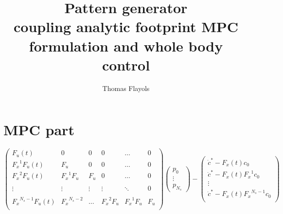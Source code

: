 \documentclass[10pt,a4paper]{article}
\begin{document}
\title{Pattern generator \\coupling analytic footprint MPC formulation and whole body control}
\author{Thomas Flayols}
\maketitle
\section*{MPC part}


\begin{equation}\label{min_velocity}
    \begin{pmatrix} 
         F_u(t)        		& 0 	 		& 0 &0& \hdots & 0 \\
         {F_x}^1 F_u(t) 		& F_u 	 		& 0 &0& \hdots & 0 \\
         {F_x}^2 F_u(t) 		& {F_x}^1 F_u 	& F_u &0& \hdots & 0 \\ \\
         \vdots	 			&\vdots 	& \vdots & \vdots &  \ddots & 0 \\ \\
         {F_x}^{N_s-1} F_u(t) 	&  {F_x}^{N_s-2}	& \hdots& {F_x}^2 F_u& {F_x}^1 F_u  & F_u \\
    \end{pmatrix}\begin{pmatrix} 
        p_0 \\
        \vdots \\
        p_{N_s}
    \end{pmatrix} - \begin{pmatrix} 
        \dot{c}^*-F_x(t) c_0\\
        \dot{c}^*-F_x(t){F_x}^1 c_0\\
        \vdots \\
        \dot{c}^*-F_x(t){F_x}^{N_s-1} c_0\\
    \end{pmatrix}
\end{equation}
\end{document}

